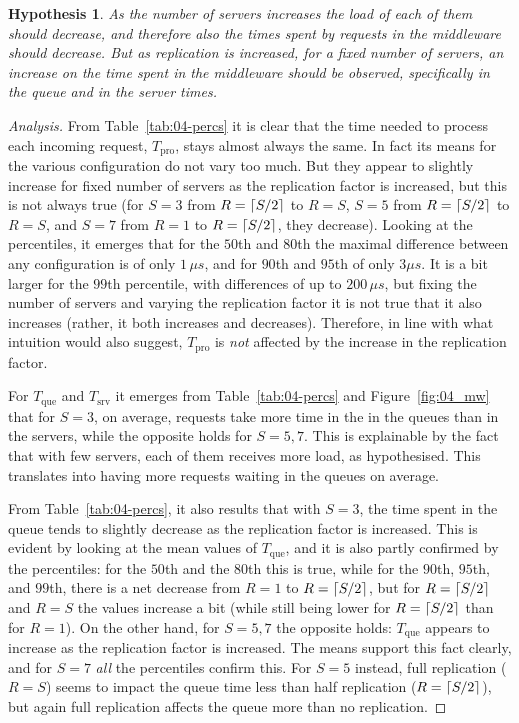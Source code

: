 \documentclass[11pt]{article}
\DeclarePairedDelimiter{\ceil}{\lceil}{\rceil}
\newtheorem{hyp}{Hypothesis}
\theoremstyle{definition}
\newenvironment{ana}[1][\proofname]{\begin{proof}[Analysis]}{\end{proof}}
\newcommand\Tque{T_{\mathrm{que}}}
\newcommand\Tsrv{T_{\mathrm{srv}}}
\newcommand\Tpro{T_{\mathrm{pro}}}
\begin{document}
\begin{hyp}
    As the number of servers increases the load of each of them should decrease, and therefore also the times spent by requests in the middleware should decrease.
    But as replication is increased, for a fixed number of servers, an increase on the time spent in the middleware should be observed, specifically in the queue and in the server times.
\end{hyp}
\begin{ana}
    From Table~\ref{tab:04-percs} it is clear that the time needed to process each incoming request, $\Tpro$, stays almost always the same.
    In fact its means for the various configuration do not vary too much.
    But they appear to slightly increase for fixed number of servers as the replication factor is increased, but this is not always true (for $S=3$ from $R=\ceil{S/2}$ to $R=S$, $S=5$ from $R=\ceil{S/2}$ to $R=S$, and $S=7$ from $R=1$ to $R=\ceil{S/2}$, they decrease).
    Looking at the percentiles, it emerges that for the $50$th and $80$th the maximal difference between any configuration is of only $1\,\mu s$, and for $90$th and $95$th of only $3\mu s$.
    It is a bit larger for the $99$th percentile, with differences of up to $200\,\mu s$, but fixing the number of servers and varying the replication factor it is not true that it also increases (rather, it both increases and decreases).
    Therefore, in line with what intuition would also suggest, $\Tpro$ is \emph{not} affected by the increase in the replication factor.
    
    For $\Tque$ and $\Tsrv$ it emerges from Table~\ref{tab:04-percs} and Figure~\ref{fig:04_mw} that for $S=3$, on average, requests take more time in the in the queues than in the servers, while the opposite holds for $S=5,7$.
    This is explainable by the fact that with few servers, each of them receives more load, as hypothesised.
    This translates into having more requests waiting in the queues on average.
    
    From Table~\ref{tab:04-percs}, it also results that with $S=3$, the time spent in the queue tends to slightly decrease as the replication factor is increased.
    This is evident by looking at the mean values of $\Tque$, and it is also partly confirmed by the percentiles: for the $50$th and the $80$th this is true, while for the $90$th, $95$th, and $99$th, there is a net decrease from $R=1$ to $R=\ceil{S/2}$, but for $R=\ceil{S/2}$ and $R=S$ the values increase a bit (while still being lower for $R=\ceil{S/2}$ than for $R=1$).
    On the other hand, for $S=5,7$ the opposite holds: $\Tque$ appears to increase as the replication factor is increased.
    The means support this fact clearly, and for $S=7$ \emph{all} the percentiles confirm this.
    For $S=5$ instead, full replication ($R=S$) seems to impact the queue time less than half replication ($R=\ceil{S/2}$), but again full replication affects the queue more than no replication.
    

\end{ana}
\end{document}
